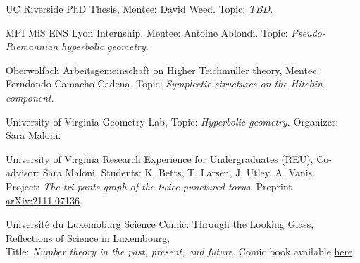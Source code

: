 {UC Riverside}
{PhD Thesis,}
{Mentee: David Weed. Topic: \emph{TBD}.}

{MPI MiS}
{ENS Lyon  Internship,}
{Mentee: Antoine Ablondi. Topic: \emph{Pseudo-Riemannian hyperbolic geometry}.}

{Oberwolfach}
{Arbeitsgemeinschaft on Higher Teichmuller theory,}
{Mentee: Ferndando Camacho Cadena. Topic: \emph{Symplectic structures on the Hitchin component}.}

{University of Virginia}
{Geometry Lab,}
{Topic: \emph{Hyperbolic geometry}. Organizer: Sara Maloni.}

{University of Virginia}
{Research Experience for Undergraduates (REU),}
{Co-advisor: Sara Maloni. Students: K. Betts, T. Larsen, J. Utley, A. Vanis. \\Project: \emph{The tri-pants graph of the twice-punctured torus}. Preprint \href{https://arxiv.org/abs/2111.07136}{arXiv:2111.07136}.}

{Universit{\'e} du Luxemoburg}
{Science Comic: Through the Looking Glass, Reflections of Science}
{\vspace{-0.3em}
{\normalsize in Luxembourg,} \\
Title: \emph{Number theory in the past, present, and future}. Comic book available \href{https://www.yumpu.com/en/document/view/62710549/science-comic-through-the-looking-glass-reflections-of-science-in-luxembourg}{here}.}
